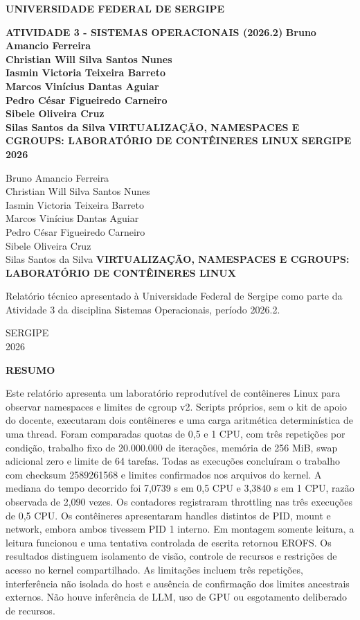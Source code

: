 \documentclass[12pt,a4paper]{article}
\newcommand{\titulotrabalho}{VIRTUALIZAÇÃO, NAMESPACES E CGROUPS: LABORATÓRIO DE CONTÊINERES LINUX}
\newcommand{\integrantes}{Bruno Amancio Ferreira\\Christian Will Silva Santos Nunes\\Iasmin Victoria Teixeira Barreto\\Marcos Vinícius Dantas Aguiar\\Pedro César Figueiredo Carneiro\\Sibele Oliveira Cruz\\Silas Santos da Silva}
\begin{document}
\hypersetup{pageanchor=false}
\begin{titlepage}
\thispagestyle{empty}
\begin{center}
\textbf{UNIVERSIDADE FEDERAL DE SERGIPE}
\vspace{1.2cm}

\textbf{ATIVIDADE 3 - SISTEMAS OPERACIONAIS (2026.2)}
\vfill
{\bfseries\integrantes}
\vfill
{\large\textbf{\titulotrabalho}}
\vfill
\textbf{SERGIPE}\\\textbf{2026}
\end{center}
\end{titlepage}

\begin{titlepage}
\thispagestyle{empty}
\begin{center}
\integrantes
\vfill
{\large\textbf{\titulotrabalho}}
\vfill
\begin{flushright}
\begin{minipage}{0.55\textwidth}
Relatório técnico apresentado à Universidade Federal de Sergipe como parte da Atividade 3 da disciplina Sistemas Operacionais, período 2026.2.
\end{minipage}
\end{flushright}
\vfill
SERGIPE\\2026
\end{center}
\end{titlepage}

\hypersetup{pageanchor=true}
\thispagestyle{empty}
\begin{center}\textbf{RESUMO}\end{center}
Este relatório apresenta um laboratório reprodutível de contêineres Linux para observar namespaces e limites de cgroup v2. Scripts próprios, sem o kit de apoio do docente, executaram dois contêineres e uma carga aritmética determinística de uma thread. Foram comparadas quotas de 0,5 e 1 CPU, com três repetições por condição, trabalho fixo de 20.000.000 de iterações, memória de 256 MiB, swap adicional zero e limite de 64 tarefas. Todas as execuções concluíram o trabalho com checksum 2589261568 e limites confirmados nos arquivos do kernel. A mediana do tempo decorrido foi 7,0739 s em 0,5 CPU e 3,3840 s em 1 CPU, razão observada de 2,090 vezes. Os contadores registraram throttling nas três execuções de 0,5 CPU. Os contêineres apresentaram handles distintos de PID, mount e network, embora ambos tivessem PID 1 interno. Em montagem somente leitura, a leitura funcionou e uma tentativa controlada de escrita retornou EROFS. Os resultados distinguem isolamento de visão, controle de recursos e restrições de acesso no kernel compartilhado. As limitações incluem três repetições, interferência não isolada do host e ausência de confirmação dos limites ancestrais externos. Não houve inferência de LLM, uso de GPU ou esgotamento deliberado de recursos.
\end{document}
